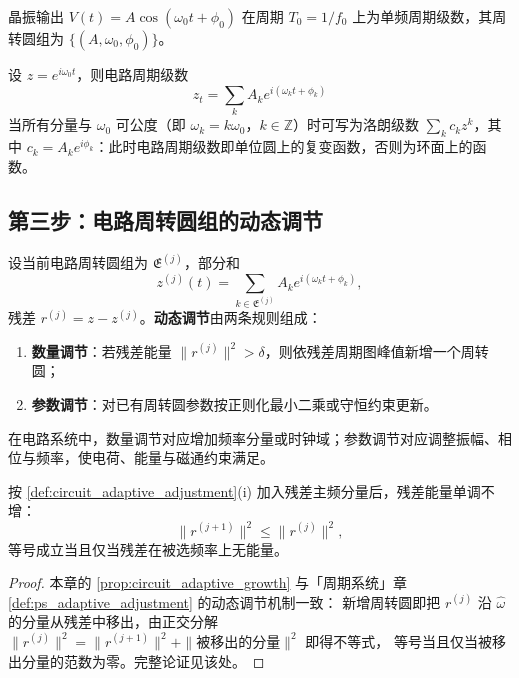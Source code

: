 \begin{example}[晶振时钟的周期级数]\label{ex:circuit_quartz_series}
晶振输出 $V(t)=A\cos(\omega_0t+\phi_0)$ 在周期 $T_0=1/f_0$ 上为单频周期级数，其周转圆组为 $\{(A,\omega_0,\phi_0)\}$。
\end{example}

\begin{remark}[周期级数即复变函数]\label{rem:circuit_series_complex}
设 $z=e^{i\omega_0t}$，则电路周期级数
\[
z_t=\sum_k A_k e^{i(\omega_k t+\phi_k)}
\]
当所有分量与 $\omega_0$ 可公度（即 $\omega_k=k\omega_0$，$k\in\mathbb Z$）时可写为洛朗级数 $\sum_k c_k z^k$，其中 $c_k=A_k e^{i\phi_k}$：此时电路周期级数即单位圆上的复变函数，否则为环面上的函数。
\end{remark}

\subsection{第三步：电路周转圆组的动态调节}

\begin{definition}[电路周转圆组的动态调节]\label{def:circuit_adaptive_adjustment}
设当前电路周转圆组为 $\mathfrak E^{(j)}$，部分和
\[
z^{(j)}(t)=\sum_{k\in\mathfrak E^{(j)}}A_k e^{i(\omega_k t+\phi_k)},
\]
残差 $r^{(j)}=z-z^{(j)}$。\textbf{动态调节}由两条规则组成：
\begin{enumerate}[label=(\roman*)]
    \item \textbf{数量调节}：若残差能量 $\|r^{(j)}\|^2>\delta$，则依残差周期图峰值新增一个周转圆；
    \item \textbf{参数调节}：对已有周转圆参数按正则化最小二乘或守恒约束更新。
\end{enumerate}
在电路系统中，数量调节对应增加频率分量或时钟域；参数调节对应调整振幅、相位与频率，使电荷、能量与磁通约束满足。
\end{definition}

\begin{proposition}[数量调节的单调性]\label{prop:circuit_adaptive_growth}
按 \cref{def:circuit_adaptive_adjustment}(i) 加入残差主频分量后，残差能量单调不增：
\[
\|r^{(j+1)}\|^2\le\|r^{(j)}\|^2,
\]
等号成立当且仅当残差在被选频率上无能量。
\end{proposition}

\begin{proof}
本章的 \cref{prop:circuit_adaptive_growth} 与「周期系统」章 \cref{def:ps_adaptive_adjustment} 的动态调节机制一致：
新增周转圆即把 $r^{(j)}$ 沿 $\hat\omega$ 的分量从残差中移出，由正交分解
$\|r^{(j)}\|^2=\|r^{(j+1)}\|^2+\|\text{被移出的分量}\|^2$ 即得不等式，
等号当且仅当被移出分量的范数为零。完整论证见该处。
\end{proof}

